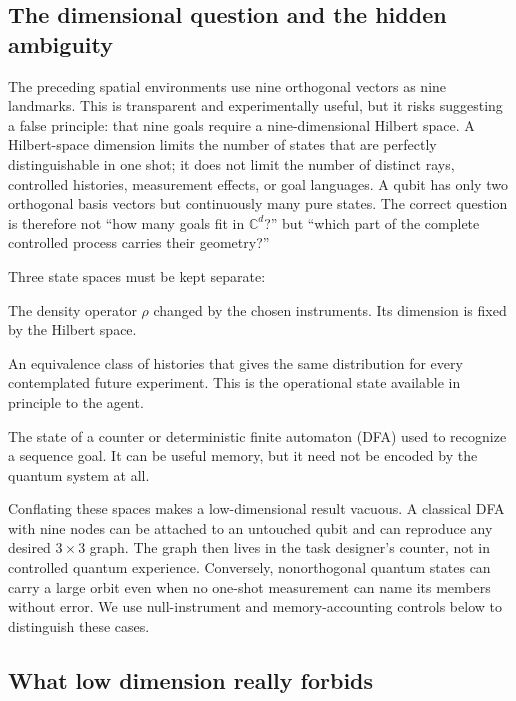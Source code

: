 \documentclass[11pt]{article}
\begin{document}
\subsection{The dimensional question and the hidden ambiguity}

The preceding spatial environments use nine orthogonal vectors as nine
landmarks. This is transparent and experimentally useful, but it risks
suggesting a false principle: that nine goals require a nine-dimensional
Hilbert space. A Hilbert-space dimension limits the number of states that are
perfectly distinguishable in one shot; it does not limit the number of
distinct rays, controlled histories, measurement effects, or goal languages.
A qubit has only two orthogonal basis vectors but continuously many pure
states. The correct question is therefore not ``how many goals fit in
$\mathbb C^d$?'' but ``which part of the complete controlled process carries
their geometry?''

Three state spaces must be kept separate:
\begin{description}[style=nextline]
 \item[Physical quantum state] The density operator $\rho$ changed by the
 chosen instruments. Its dimension is fixed by the Hilbert space.
 \item[Predictive state] An equivalence class of histories that gives the same
 distribution for every contemplated future experiment. This is the
 operational state available in principle to the agent.
 \item[Goal-progress state] The state of a counter or deterministic finite
 automaton (DFA) used to recognize a sequence goal. It can be useful memory,
 but it need not be encoded by the quantum system at all.
\end{description}
Conflating these spaces makes a low-dimensional result vacuous. A classical
DFA with nine nodes can be attached to an untouched qubit and can reproduce
any desired $3\times3$ graph. The graph then lives in the task designer's
counter, not in controlled quantum experience. Conversely, nonorthogonal
quantum states can carry a large orbit even when no one-shot measurement can
name its members without error. We use null-instrument and memory-accounting
controls below to distinguish these cases.

\subsection{What low dimension really forbids}
\end{document}
